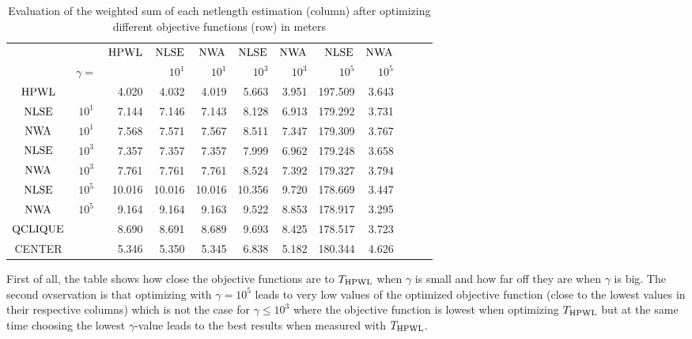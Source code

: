 \begin{table}[h]
 \centering
 \begin{tabular}{c c | r r r r r r r r r r}
               &                   & \(\operatorname{HPWL}\) & \(\operatorname{NLSE}\)   & \(\operatorname{NWA}\)    & \(\operatorname{NLSE}\)   & \(\operatorname{NWA}\)    & \(\operatorname{NLSE}\)    & \(\operatorname{NWA}\) \\
               & \(\gamma =\)      &           & \(10^1\)    & \(10^1\)    & \(10^3\)    & \(10^3\)    & \(10^5\)     & \(10^5\) \\
  \hline
  \(\operatorname{HPWL}\)    &                   & 4.020     & 4.032       & 4.019       & 5.663       & 3.951       & 197.509      & 3.643    \\
  \(\operatorname{NLSE}\)    & \(10^1\)          & 7.144     & 7.146       & 7.143       & 8.128       & 6.913       & 179.292      & 3.731    \\
  \(\operatorname{NWA}\)     & \(10^1\)          & 7.568     & 7.571       & 7.567       & 8.511       & 7.347       & 179.309      & 3.767    \\
  \(\operatorname{NLSE}\)    & \(10^3\)          & 7.357     & 7.357       & 7.357       & 7.999       & 6.962       & 179.248      & 3.658    \\
  \(\operatorname{NWA}\)     & \(10^3\)          & 7.761     & 7.761       & 7.761       & 8.524       & 7.392       & 179.327      & 3.794    \\
  \(\operatorname{NLSE}\)    & \(10^5\)          & 10.016    & 10.016      & 10.016      & 10.356      & 9.720       & 178.669      & 3.447    \\
  \(\operatorname{NWA}\)     & \(10^5\)          & 9.164     & 9.164       & 9.163       & 9.522       & 8.853       & 178.917      & 3.295    \\
  \(\operatorname{QCLIQUE}\) &                   & 8.690     & 8.691       & 8.689       & 9.693       & 8.425       & 178.517      & 3.723    \\
  CENTER       &                   & 5.346     & 5.350       & 5.345       & 6.838       & 5.182       & 180.344      & 4.626    \\
 \end{tabular}
 \caption{Evaluation of the weighted sum of each netlength estimation (column) after optimizing different objective functions (row) in meters}
 \label{table:baseline_netlength_estimation_by_objective_function}
\end{table}

First of all, the table shows how close the objective functions are to \(T_{\operatorname{HPWL}}\) when \(\gamma\) is small
and how far off they are when \(\gamma\) is big.
The second ovservation is that
optimizing with \(\gamma = 10^5\) leads to very low values of the optimized objective function (close to the lowest values in their respective columns)
which is not the case for \(\gamma \leq 10^3\) where the objective function is lowest when optimizing \(T_{\operatorname{HPWL}}\)
but at the same time choosing the lowest \(\gamma\)-value leads to the best results when measured with \(T_{\operatorname{HPWL}}\).

